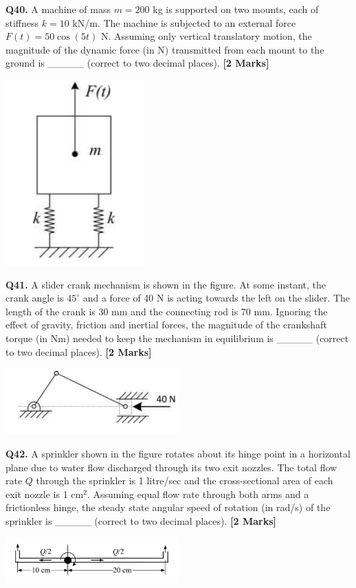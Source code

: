 \documentclass[11pt]{article}
\newcommand{\questionb}[2]{
    \noindent\textbf{Q#2.} #1 \hfill \textbf{[2 Marks]}
}
\begin{document}
\questionb{A machine of mass \( m = 200 \) kg is supported on two mounts, each of stiffness \( k = 10 \) kN/m. The machine is subjected to an external force \( F(t) = 50 \cos(5t) \) N. Assuming only vertical translatory motion, the magnitude of the dynamic force (in N) transmitted from each mount to the ground is \_\_\_\_\_ (correct to two decimal places).}{40}
\begin{center}
\includegraphics[width=0.4\textwidth]{figures/40.png}
\end{center}
\vspace{0.5cm}

\questionb{A slider crank mechanism is shown in the figure. At some instant, the crank angle is \( 45^\circ \) and a force of 40 N is acting towards the left on the slider. The length of the crank is 30 mm and the connecting rod is 70 mm. Ignoring the effect of gravity, friction and inertial forces, the magnitude of the crankshaft torque (in Nm) needed to keep the mechanism in equilibrium is \_\_\_\_\_ (correct to two decimal places).}{41}
\begin{center}
\includegraphics[width=0.5\textwidth]{figures/41.png}
\end{center}
\vspace{0.5cm}

\questionb{A sprinkler shown in the figure rotates about its hinge point in a horizontal plane due to water flow discharged through its two exit nozzles. The total flow rate \( Q \) through the sprinkler is 1 litre/sec and the cross-sectional area of each exit nozzle is 1 cm\(^2\). Assuming equal flow rate through both arms and a frictionless hinge, the steady state angular speed of rotation (in rad/s) of the sprinkler is \_\_\_\_\_ (correct to two decimal places).}{42}
\begin{center}
\includegraphics[width=0.5\textwidth]{figures/42.png}
\end{center}
\vspace{0.5cm}
\end{document}
